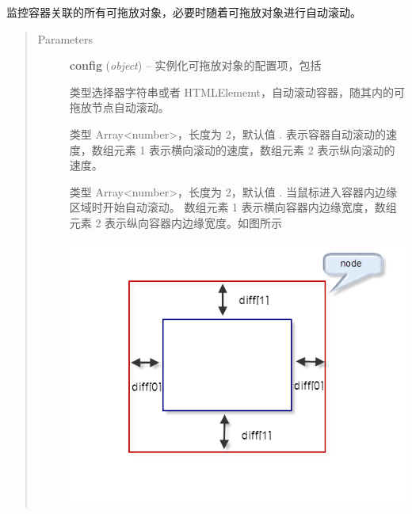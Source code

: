 \documentclass[letterpaper,10pt,english]{sphinxmanual}
\begin{document}
\begin{fulllineitems}
\label{api/component/dd/scroll:DD.Scroll}
监控容器关联的所有可拖放对象，必要时随着可拖放对象进行自动滚动。
\begin{quote}\begin{description}
\item[{Parameters}] \leavevmode
\textbf{config} (\emph{object}) --
实例化可拖放对象的配置项，包括


\begin{fulllineitems}
\label{api/component/dd/scroll:DD.Scroll.config.node}
类型选择器字符串或者 HTMLElememt，自动滚动容器，随其内的可拖放节点自动滚动。

\end{fulllineitems}



\begin{fulllineitems}
\label{api/component/dd/scroll:DD.Scroll.config.rate}
类型 Array\textless{}number\textgreater{}，长度为 2，默认值 \code{{[}10,10{]}} . 表示容器自动滚动的速度，数组元素 1 表示横向滚动的速度，数组元素 2 表示纵向滚动的速度。

\end{fulllineitems}



\begin{fulllineitems}
\label{api/component/dd/scroll:DD.Scroll.config.diff}
类型 Array\textless{}number\textgreater{}，长度为 2，默认值 \code{{[}20,20{]}} . 当鼠标进入容器内边缘区域时开始自动滚动。
数组元素 1 表示横向容器内边缘宽度，数组元素 2 表示纵向容器内边缘宽度。如图所示

\includegraphics{scroll1.png}


\end{fulllineitems}
\end{description}
\end{quote}
\end{fulllineitems}
\end{document}
